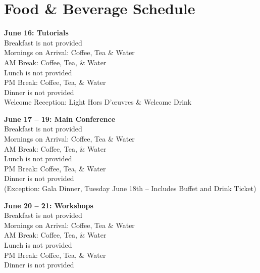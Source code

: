 \setheaders{}{}
\section{Food \& Beverage Schedule}{}

\textbf{June 16: Tutorials}\\
\hspace*{0.2in}Breakfast is not provided \\
\hspace*{0.2in}Mornings on Arrival: Coffee, Tea \& Water \\
\hspace*{0.2in}AM Break: Coffee, Tea, \& Water \\
\hspace*{0.2in}Lunch is not provided \\
\hspace*{0.2in}PM Break: Coffee, Tea, \& Water \\
\hspace*{0.2in}Dinner is not provided \\
\hspace*{0.2in}Welcome Reception: Light Hors D'\oe{}uvres \& Welcome Drink

\textbf{June 17 -- 19: Main Conference} \\
\hspace*{0.2in}Breakfast is not provided \\
\hspace*{0.2in}Mornings on Arrival: Coffee, Tea \& Water \\
\hspace*{0.2in}AM Break: Coffee, Tea, \& Water \\
\hspace*{0.2in}Lunch is not provided \\
\hspace*{0.2in}PM Break: Coffee, Tea, \& Water \\
\hspace*{0.2in}Dinner is not provided \\
\hspace*{0.2in}(Exception: Gala Dinner, Tuesday June 18th -- Includes Buffet and Drink Ticket)

\textbf{June 20 -- 21: Workshops} \\
\hspace*{0.2in}Breakfast is not provided \\
\hspace*{0.2in}Mornings on Arrival: Coffee, Tea \& Water \\
\hspace*{0.2in}AM Break: Coffee, Tea, \& Water \\
\hspace*{0.2in}Lunch is not provided \\
\hspace*{0.2in}PM Break: Coffee, Tea, \& Water \\
\hspace*{0.2in}Dinner is not provided

